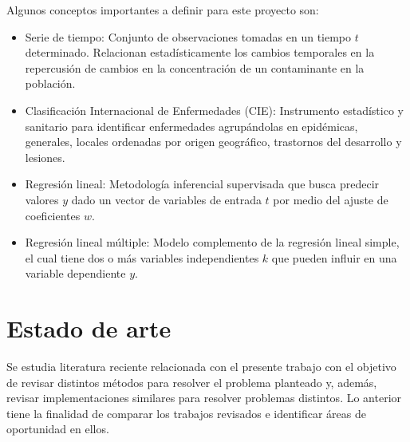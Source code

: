 \documentclass[a0]{sciposter} %
\begin{document}
\begin{multicols}{3}
Algunos conceptos importantes a definir para este proyecto son:
\begin{itemize}
	\item Serie de tiempo: Conjunto de observaciones tomadas en un tiempo $t$ determinado. Relacionan estadísticamente los cambios temporales en la repercusión de cambios en la concentración de un contaminante en la población.
	\item Clasificación Internacional de Enfermedades (CIE): Instrumento estadístico y sanitario para identificar enfermedades agrupándolas en epidémicas, generales, locales ordenadas por origen geográfico, trastornos del desarrollo y lesiones.
	\item Regresión lineal: Metodología inferencial supervisada que busca predecir valores $y$ dado un vector de variables de entrada $t$ por medio del ajuste de coeficientes $w$.
	\item Regresión lineal múltiple: Modelo complemento de la regresión lineal simple, el cual tiene dos o más variables independientes $k$ que pueden influir en una variable dependiente $y$.
\end{itemize}

\section{Estado de arte}
Se estudia literatura reciente relacionada con el presente trabajo con el objetivo de revisar distintos métodos para resolver el problema planteado y, además, revisar implementaciones similares para resolver problemas distintos. Lo anterior tiene la finalidad de comparar los trabajos revisados e identificar áreas de oportunidad en ellos.


\end{multicols}
\end{document}
